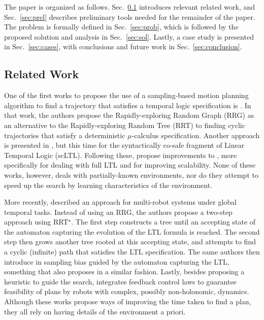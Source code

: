 The paper is organized as follows. Sec.~\ref{sec:related} introduces relevant related work, and Sec.~\ref{sec:prel} describes preliminary tools needed for the remainder of the paper. The problem is formally defined in Sec.~\ref{sec:prob}, which is followed by the proposed solution and analysis in Sec.~\ref{sec:sol}. Lastly, a case study is presented in Sec.~\ref{sec:cases}, with conclusions and future work in Sec.~\ref{sec:conclusion}.



\subsection{Related Work} \label{sec:related}
One of the first works to propose the use of a sampling-based motion planning algorithm to find a trajectory that satisfies a temporal logic specification is \cite{karaman2009sampling}. In that work, the authors propose the Rapidly-exploring Random Graph (RRG) as an alternative to the Rapidly-exploring Random Tree (RRT) to finding cyclic trajectories that satisfy a deterministic $\mu$-calculus specification. Another approach is presented in \cite{bhatia2010sampling}, but this time for the syntactically co-safe fragment of Linear Temporal Logic (scLTL). Following these, \citet{vasile2013sampling} propose improvements to \cite{karaman2009sampling}, more specifically for dealing with full LTL and for improving scalability. None of these works, however, deals with partially-known environments, nor do they attempt to speed up the search by learning characteristics of the environment.

More recently, \citet{kantaros2018sampling} described an approach for multi-robot systems under global temporal tasks. Instead of using an RRG, the authors propose a two-step approach using RRT$^\star$. The first step constructs a tree until an accepting state of the automaton capturing the evolution of the LTL formula is reached. The second step then grows another tree rooted at this accepting state, and attempts to find a cyclic (infinite) path that satisfies the LTL specification. The same authors then introduce in \cite{kantaros2020stylus} sampling bias guided by the automaton capturing the LTL, something that \cite{luo2019abstraction} also proposes in a similar fashion. Lastly, besides proposing a heuristic to guide the search, \cite{tajvar2020safe} integrates feedback control laws to guarantee feasibility of plans by robots with complex, possibly non-holonomic, dynamics. Although these works propose ways of improving the time taken to find a plan, they all rely on having details of the environment a priori.

